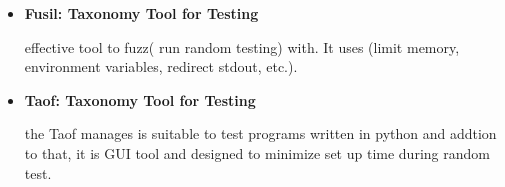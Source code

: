 \documentclass [10pt]{article}
\begin{document}
\begin{enumerate}
\begin{itemize}
	\item \textbf{ Fusil: Taxonomy Tool for Testing}
    \par effective tool to fuzz( run random testing) with. It uses (limit memory, environment variables, redirect stdout, etc.).\par
    \item \textbf{ Taof: Taxonomy Tool for Testing}
    \par the Taof manages is suitable to test programs written in python and addtion to that, it is GUI tool and designed to minimize set up time during random test.
\end{itemize}



\end{enumerate}
\end{document}
